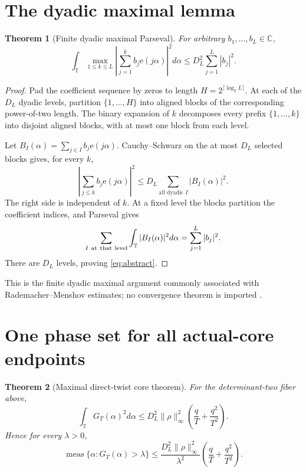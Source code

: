 \documentclass[11pt]{article}
\newtheorem{theorem}{Theorem}[section]
\theoremstyle{definition}
\newcommand{\e}{\mathrm e}
\newcommand{\T}{\mathbb T}
\newcommand{\norm}[1]{\lVert#1\rVert}
\begin{document}
\section{The dyadic maximal lemma}

\begin{theorem}[Finite dyadic maximal Parseval]\label{thm:abstract}
For arbitrary \(b_1,\ldots,b_L\in\mathbb C\),
\begin{equation}
 \boxed{\quad
 \int_{\T}\max_{1\le k\le L}
 \left|\sum_{j=1}^kb_j\e(j\alpha)\right|^2d\alpha
 \le D_L^2\sum_{j=1}^L|b_j|^2.
 \quad}
\label{eq:abstract}
\end{equation}
\end{theorem}

\begin{proof}
Pad the coefficient sequence by zeros to length
\(H=2^{\lceil\log_2L\rceil}\).  At each of the \(D_L\) dyadic levels,
partition \(\{1,\ldots,H\}\) into aligned blocks of the corresponding
power-of-two length.  The binary expansion of \(k\) decomposes every
prefix \(\{1,\ldots,k\}\) into disjoint aligned blocks, with at most
one block from each level.

Let \(B_I(\alpha)=\sum_{j\in I}b_j\e(j\alpha)\).  Cauchy--Schwarz on
the at most \(D_L\) selected blocks gives, for every \(k\),
\[
 \left|\sum_{j\le k}b_j\e(j\alpha)\right|^2
 \le D_L\sum_{\text{all dyadic }I}|B_I(\alpha)|^2.
\]
The right side is independent of \(k\).  At a fixed level the blocks
partition the coefficient indices, and Parseval gives
\[
 \sum_{I\ {\rm at\ that\ level}}
 \int_{\T}|B_I(\alpha)|^2d\alpha
 =\sum_{j=1}^L|b_j|^2.
\]
There are \(D_L\) levels, proving \eqref{eq:abstract}.
\end{proof}

This is the finite dyadic maximal argument commonly associated with
Rademacher--Menshov estimates; no convergence theorem is imported
\citep{Zygmund2002}.

\section{One phase set for all actual-core endpoints}

\begin{theorem}[Maximal direct-twist core theorem]\label{thm:core}
For the determinant-two fiber above,
\begin{equation}
 \boxed{\quad
 \int_{\T}G_T(\alpha)^2d\alpha
 \le
 D_L^2\norm{\rho}_\infty^2
 \left(\frac qT+\frac{q^2}{T^2}\right).
 \quad}
\label{eq:core}
\end{equation}
Hence for every \(\lambda>0\),
\begin{equation}
 \operatorname{meas}\{\alpha:G_T(\alpha)>\lambda\}
 \le
 \frac{D_L^2\norm{\rho}_\infty^2}{\lambda^2}
 \left(\frac qT+\frac{q^2}{T^2}\right).
\label{eq:measure}
\end{equation}
\end{theorem}
\end{document}
